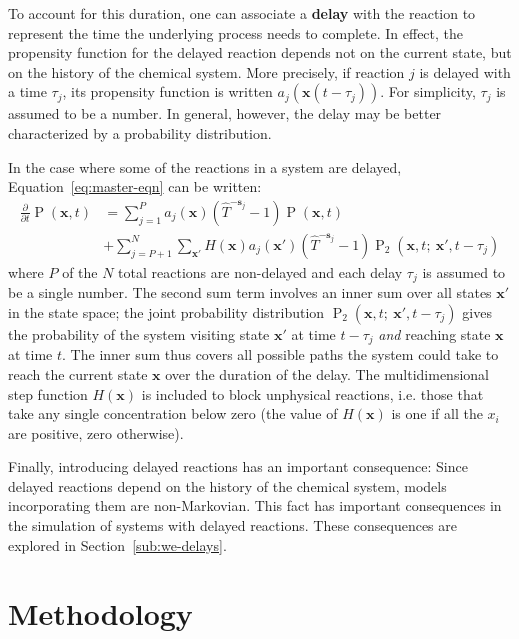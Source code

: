 \documentclass[english,letterpaper,12pt]{article}
\newcommand{\defkeywd}[1]{\textbf{#1}}
\renewcommand{\vec}[1]{\ensuremath{\mathbf{#1}}}
\DeclareMathOperator{\Prob}{P}
\newcommand{\delaytime}{\ensuremath{\tau}}
\begin{document}
\begin{doublespacing}
To account for this duration, one can associate a \defkeywd{delay} with the reaction to represent the time the underlying process needs to complete. In effect, the propensity function for the delayed reaction depends not on the current state, but on the history of the chemical system. More precisely, if reaction $j$ is delayed with a time $\delaytime_j$, its propensity function is written $a_j \left(\vec{x}(t - \delaytime_j) \right)$. For simplicity, $\delaytime_j$ is assumed to be a number. In general, however, the delay may be better characterized by a probability distribution.

In the case where some of the reactions in a system are delayed, Equation~\eqref{eq:master-eqn} can be written:
\begin{align}
    \frac{\partial}{\partial t} \Prob(\vec{x}, t) &= \sum_{j=1}^P a_j(\vec{x})(\hat{T}^{-\vec{s}_j} - 1)\Prob(\vec{x}, t) \\
                                                  &+ \sum_{j=P+1}^N \sum_{\vec{x}'} H(\vec{x}) a_j(\vec{x}') (\hat{T}^{-\vec{s}_j} - 1) \Prob_2(\vec{x}, t;\: \vec{x}', t - \delaytime_j)
    \label{eq:master-eqn-delay}
\end{align}
where $P$ of the $N$ total reactions are non-delayed and each delay $\delaytime_j$ is assumed to be a single number. The second sum term involves an inner sum over all states $\vec{x}'$ in the state space; the joint probability distribution $\Prob_2(\vec{x}, t;\: \vec{x}', t - \delaytime_j)$ gives the probability of the system visiting state $\vec{x}'$ at time $t - \delaytime_j$ \emph{and} reaching state $\vec{x}$ at time $t$. The inner sum thus covers all possible paths the system could take to reach the current state $\vec{x}$ over the duration of the delay. The multidimensional step function $H(\vec{x})$ is included to block unphysical reactions, i.e. those that take any single concentration below zero (the value of $H(\vec{x})$ is one if all the $x_i$ are positive, zero otherwise). 

Finally, introducing delayed reactions has an important consequence: Since delayed reactions depend on the history of the chemical system, models incorporating them are non-Markovian. This fact has important consequences in the simulation of systems with delayed reactions. These consequences are explored in Section~\ref{sub:we-delays}.



\section{Methodology} %
\label{sec:methodology}


\end{doublespacing}
\end{document}
